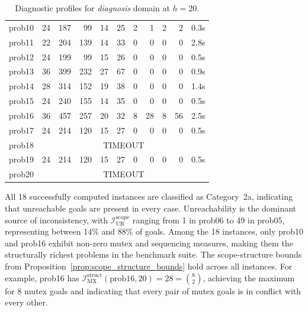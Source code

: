 \begin{table}[ht]
\begin{tabular}{lrrr rr rr rr r}
        prob10           & 24                                & 187             & 99    & 14 & 25 & 2 & 1  & 2 & 2  & 0.3s  \\
        prob11           & 22                                & 204             & 139   & 14 & 33 & 0 & 0  & 0 & 0  & 2.8s  \\
        prob12           & 24                                & 199             & 99    & 15 & 26 & 0 & 0  & 0 & 0  & 0.5s  \\
        prob13           & 36                                & 399             & 232   & 27 & 67 & 0 & 0  & 0 & 0  & 0.9s  \\
        prob14           & 28                                & 314             & 152   & 19 & 38 & 0 & 0  & 0 & 0  & 1.4s  \\
        prob15           & 24                                & 240             & 155   & 14 & 35 & 0 & 0  & 0 & 0  & 0.5s  \\
        prob16           & 36                                & 457             & 257   & 20 & 32 & 8 & 28 & 8 & 56 & 2.5s  \\
        prob17           & 24                                & 214             & 120   & 15 & 27 & 0 & 0  & 0 & 0  & 0.5s  \\
        prob18           & \multicolumn{10}{c}{TIMEOUT}                                                                    \\
        prob19           & 24                                & 214             & 120   & 15 & 27 & 0 & 0  & 0 & 0  & 0.5s  \\
        prob20           & \multicolumn{10}{c}{TIMEOUT}                                                                    \\
        \bottomrule
    \end{tabular}
    \caption{Diagnostic profiles for \textit{diagnosis} domain at $h = 20$.}
    \label{tab:diagnosis_results}
\end{table}

All 18 successfully computed instances are classified as Category~2a, indicating that unreachable goals are present in every case. Unreachability is the dominant source of inconsistency, with $\mathcal{I}^{\text{scope}}_{\text{UR}}$ ranging from 1 in prob06 to 49 in prob05, representing between 14\% and 88\% of goals. Among the 18 instances, only prob10 and prob16 exhibit non-zero mutex and sequencing measures, making them the structurally richest problems in the benchmark suite. The scope-structure bounds from Proposition~\ref{prop:scope_structure_bounds} hold across all instances. For example, prob16 has $\mathcal{I}^{\text{struct}}_{\text{MX}}(\text{prob16}, 20) = 28 = \binom{8}{2}$, achieving the maximum for 8 mutex goals and indicating that every pair of mutex goals is in conflict with every other.

